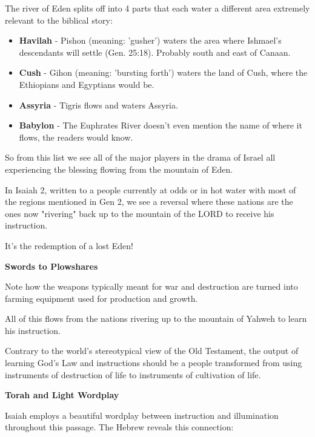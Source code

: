 \documentclass[11pt]{article}
\begin{document}
The river of Eden splits off into 4 parts that each water a different area extremely relevant to the biblical story:
\begin{itemize}
    \item \textbf{Havilah} - Pishon (meaning: 'gusher') waters the area where Ishmael's descendants will settle (Gen. 25:18). Probably south and east of Canaan.
    \item \textbf{Cush} - Gihon (meaning: 'bursting forth') waters the land of Cush, where the Ethiopians and Egyptians would be.
    \item \textbf{Assyria} - Tigris flows and waters Assyria.
    \item \textbf{Babylon} - The Euphrates River doesn't even mention the name of where it flows, the readers would know.
\end{itemize}

So from this list we see all of the major players in the drama of Israel all experiencing the blessing flowing from the mountain of Eden.

In Isaiah 2, written to a people currently at odds or in hot water with most of the regions mentioned in Gen 2, we see a reversal where these nations are the ones
now "rivering" back up to the mountain of the LORD to receive his instruction.

It's the redemption of a lost Eden!


\vspace{3em}
{\large\bfseries Swords to Plowshares}
\vspace{1em}

Note how the weapons typically meant for war and destruction are turned into farming equipment
used for production and growth.

All of this flows from the nations rivering up to the mountain of Yahweh to learn his instruction.

{\vspace{1em}}

Contrary to the world's stereotypical view of the Old Testament, the output of learning God's Law and instructions
should be a people transformed from using instruments of destruction of life to instruments of cultivation of life.

\vspace{3em}
{\large\bfseries Torah and Light Wordplay}
\vspace{1em}

Isaiah employs a beautiful wordplay between instruction and illumination throughout this passage. The Hebrew reveals this connection:
\end{document}
